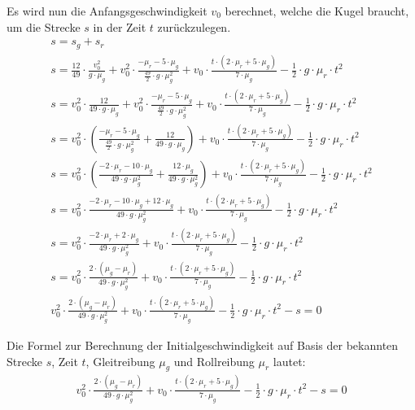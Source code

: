 Es wird nun die Anfangsgeschwindigkeit $v_0$ berechnet, welche die Kugel braucht, um die Strecke $s$ in der Zeit $t$
zurückzulegen.
\begin{align}
    s = s_g + s_r\\
    s = \frac{12}{49} \cdot \frac{v_0^2}{g \cdot \mu_g} + v_0^2 \cdot \frac{-\mu_r - 5 \cdot \mu_g}{\frac{49}{2} \cdot g \cdot \mu_g^2} + v_0 \cdot \frac{t \cdot (2 \cdot \mu_r + 5 \cdot \mu_g)}{7 \cdot \mu_g} - \frac{1}{2} \cdot g \cdot \mu_r \cdot t^2\\
    s = v_0^2 \cdot \frac{12}{49 \cdot g \cdot \mu_g} + v_0^2 \cdot \frac{-\mu_r - 5 \cdot \mu_g}{\frac{49}{2} \cdot g \cdot \mu_g^2} + v_0 \cdot \frac{t \cdot (2 \cdot \mu_r + 5 \cdot \mu_g)}{7 \cdot \mu_g} - \frac{1}{2} \cdot g \cdot \mu_r \cdot t^2\\
    s = v_0^2 \cdot (\frac{-\mu_r - 5 \cdot \mu_g}{\frac{49}{2} \cdot g \cdot \mu_g^2} + \frac{12}{49 \cdot g \cdot \mu_g}) + v_0 \cdot \frac{t \cdot (2 \cdot \mu_r + 5 \cdot \mu_g)}{7 \cdot \mu_g} - \frac{1}{2} \cdot g \cdot \mu_r \cdot t^2\\
    s = v_0^2 \cdot (\frac{-2 \cdot \mu_r - 10 \cdot \mu_g}{49 \cdot g \cdot \mu_g^2} + \frac{12 \cdot \mu_g}{49 \cdot g \cdot \mu_g^2}) + v_0 \cdot \frac{t \cdot (2 \cdot \mu_r + 5 \cdot \mu_g)}{7 \cdot \mu_g} - \frac{1}{2} \cdot g \cdot \mu_r \cdot t^2\\
    s = v_0^2 \cdot \frac{-2 \cdot \mu_r - 10 \cdot \mu_g + 12 \cdot \mu_g}{49 \cdot g \cdot \mu_g^2} + v_0 \cdot \frac{t \cdot (2 \cdot \mu_r + 5 \cdot \mu_g)}{7 \cdot \mu_g} - \frac{1}{2} \cdot g \cdot \mu_r \cdot t^2\\
    s = v_0^2 \cdot \frac{-2 \cdot \mu_r + 2 \cdot \mu_g}{49 \cdot g \cdot \mu_g^2} + v_0 \cdot \frac{t \cdot (2 \cdot \mu_r + 5 \cdot \mu_g)}{7 \cdot \mu_g} - \frac{1}{2} \cdot g \cdot \mu_r \cdot t^2\\
    s = v_0^2 \cdot \frac{2 \cdot (\mu_g - \mu_r)}{49 \cdot g \cdot \mu_g^2} + v_0 \cdot \frac{t \cdot (2 \cdot \mu_r + 5 \cdot \mu_g)}{7 \cdot \mu_g} - \frac{1}{2} \cdot g \cdot \mu_r \cdot t^2\\
    v_0^2 \cdot \frac{2 \cdot (\mu_g - \mu_r)}{49 \cdot g \cdot \mu_g^2} + v_0 \cdot \frac{t \cdot (2 \cdot \mu_r + 5 \cdot \mu_g)}{7 \cdot \mu_g} - \frac{1}{2} \cdot g \cdot \mu_r \cdot t^2 - s = 0
\end{align}

Die Formel zur Berechnung der Initialgeschwindigkeit auf Basis der bekannten Strecke $s$, Zeit $t$, Gleitreibung $\mu_g$ und
Rollreibung $\mu_r$ lautet:
\begin{align}
    v_0^2 \cdot \frac{2 \cdot (\mu_g - \mu_r)}{49 \cdot g \cdot \mu_g^2} + v_0 \cdot \frac{t \cdot (2 \cdot \mu_r + 5 \cdot \mu_g)}{7 \cdot \mu_g} - \frac{1}{2} \cdot g \cdot \mu_r \cdot t^2 - s = 0
\end{align}


